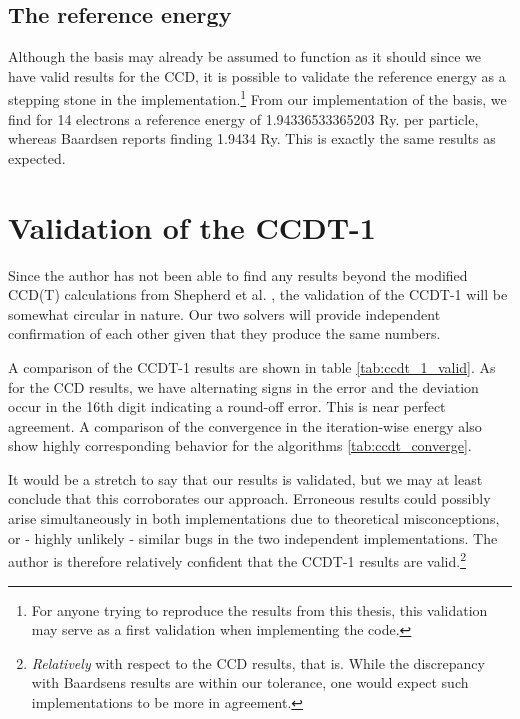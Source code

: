 \subsection{The reference energy}

Although the basis may already be assumed to function as it should since we have valid results for the CCD, it is possible to validate the reference energy as a stepping stone in the implementation.\footnote{For anyone trying to reproduce the results from this thesis, this validation may serve as a first validation when implementing the code.} From our implementation of the basis, we find for 14 electrons a reference energy of 1.94336533365203 Ry. per particle, whereas Baardsen \cite{Baardsen2015}reports finding 1.9434 Ry. This is exactly the same results as expected. 

\section{Validation of the CCDT-1}

Since the author has not been able to find any results beyond the modified CCD(T) calculations from Shepherd et al. \cite{Shepherd2013}, the validation of the CCDT-1 will be somewhat circular in nature. Our two solvers will provide independent confirmation of each other given that they produce the same numbers.

A comparison of the CCDT-1 results are shown in table \ref{tab:ccdt_1_valid}. As for the CCD results, we have alternating signs in the error and the deviation occur in the 16th digit indicating a round-off error. This is near perfect agreement. A comparison of the convergence in the iteration-wise energy also show highly corresponding behavior for the algorithms \ref{tab:ccdt_converge}.

It would be a stretch to say that our results is validated, but we may at least conclude that this corroborates our approach. Erroneous results could possibly arise simultaneously in both implementations due to theoretical misconceptions, or - highly unlikely - similar bugs in the two independent implementations. The author is therefore relatively confident that the CCDT-1 results are valid.\footnote{\emph{Relatively} with respect to the CCD results, that is. While the discrepancy with Baardsens results are within our tolerance, one would expect such implementations to be more in agreement.}




